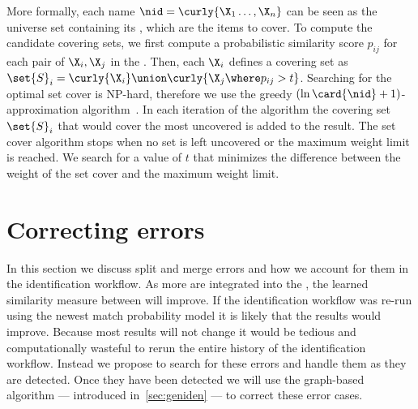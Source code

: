     More formally, each name $\nid = \curly{\X_1 \ldots, \X_n}$ can be seen as
      the universe set containing its \annots{}, which are the items to cover.
    To compute the candidate covering sets, we first compute a probabilistic
      similarity score $p_{ij}$ for each pair of \annots{} $\X_i, \X_j$ in the
      \name{}.
    Then, each \annot{} $\X_i$ defines a covering set as $\set{S}_i =
      \curly{\X_i} \union \curly{\X_j \where p_{ij} > t}$.
    Searching for the optimal set cover is NP-hard, therefore we use the
      greedy %
    $(\ln{\card{\nid}} + 1)$-approximation
      algorithm~\cite{chvatal_greedy_1979,johnson_approximation_1973,lovasz_ratio_1975}.
    In each iteration of the algorithm the covering set $\set{S}_i$ that would
      cover the most uncovered \annots{} is added to the result.
    The set cover algorithm stops when no set is left uncovered or the maximum
      weight limit is reached.
    We search for a value of $t$ that minimizes the difference between the
      weight of the set cover and the maximum weight limit.

\section{Correcting errors}\label{sec:errors}
    In this section we discuss split and merge errors and how we account for
      them in the identification workflow.
    As more \occurrences{} are integrated into the \masterdatabase{}, the
      learned similarity measure between \annots{} will improve.
    If the identification workflow was re-run using the newest match
      probability model it is likely that the results would improve.
    Because most results will not change it would be tedious and
      computationally wasteful to rerun the entire history of the identification
      workflow.
    Instead we propose to search for these errors and handle them as they are
      detected.
    Once they have been detected we will use the graph-based algorithm ---
      introduced in~\cref{sec:geniden} --- to correct these error cases.

